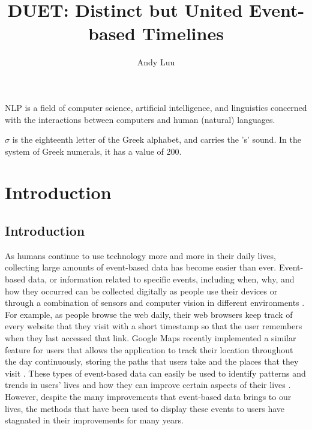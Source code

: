 \documentclass[doublespace,draft,nopageskip]{VTthesis} %
\title{DUET: Distinct but United Event-based Timelines}
\author{Andy Luu}
\begin{document}
  \frontmatter
  \maketitle
  \tableofcontents

	\listoffigures
	\listoftables
    \printnomenclature %

NLP is a field of computer science, artificial intelligence, and linguistics concerned with the interactions between computers and human (natural) languages.
 
 
$\sigma$ is the eighteenth letter of the Greek alphabet, and carries the 's' sound. In the system of Greek numerals, it has a value of 200. 
 

\mainmatter

\chapter{Introduction} \label{ch:introduction}
\section{Introduction} \label{se:introduction}
As humans continue to use technology more and more in their daily lives, collecting large amounts of event-based data has become easier than ever. Event-based data, or information related to specific events, including when, why, and how they occurred can be collected digitally as people use their devices or through a combination of sensors and computer vision in different environments \cite{satterthwaiteEventBasedDataData}. For example, as people browse the web daily, their web browsers keep track of every website that they visit with a short timestamp so that the user remembers when they last accessed that link. Google Maps recently implemented a similar feature for users that allows the application to track their location throughout the day continuously, storing the paths that users take and the places that they visit \cite{macarullarodriguezGoogleTimelineAccuracy2018}. These types of event-based data can easily be used to identify patterns and trends in users' lives and how they can improve certain aspects of their lives \cite{satterthwaiteEventBasedDataData}. However, despite the many improvements that event-based data brings to our lives, the methods that have been used to display these events to users have stagnated in their improvements for many years.
\end{document}
